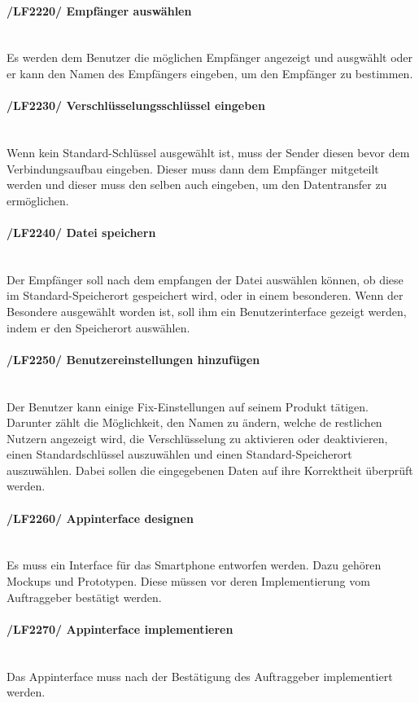 \begin{indentE}
	\paragraph{/LF2220/ Empfänger auswählen}\mbox{}\\
	Es werden dem Benutzer die möglichen Empfänger angezeigt und ausgwählt oder er kann den Namen des Empfängers eingeben, um den Empfänger zu bestimmen.
	\paragraph{/LF2230/ Verschlüsselungsschlüssel eingeben}\mbox{}\\
	Wenn kein Standard-Schlüssel ausgewählt ist, muss der Sender diesen bevor dem Verbindungsaufbau eingeben. Dieser muss dann dem Empfänger mitgeteilt werden und dieser muss den selben auch eingeben, um den Datentransfer zu ermöglichen.
	\paragraph{/LF2240/ Datei speichern}\mbox{}\\
	Der Empfänger soll nach dem empfangen der Datei auswählen können, ob diese im Standard-Speicherort gespeichert wird, oder in einem besonderen. Wenn der Besondere ausgewählt worden ist, soll ihm ein Benutzerinterface gezeigt werden, indem er den Speicherort auswählen.
	\paragraph{/LF2250/ Benutzereinstellungen hinzufügen}\mbox{}\\
	Der Benutzer kann einige Fix-Einstellungen auf seinem Produkt tätigen. Darunter zählt die Möglichkeit, den Namen zu ändern, welche de restlichen Nutzern angezeigt wird, die Verschlüsselung zu aktivieren oder deaktivieren, einen Standardschlüssel auszuwählen und einen Standard-Speicherort auszuwählen. Dabei sollen die eingegebenen Daten auf ihre Korrektheit überprüft werden.
	\paragraph{/LF2260/ Appinterface designen}\mbox{}\\
	Es muss ein Interface für das Smartphone entworfen werden. Dazu gehören Mockups und Prototypen. Diese müssen vor deren Implementierung vom Auftraggeber bestätigt werden.
	\paragraph{/LF2270/ Appinterface implementieren}\mbox{}\\
	Das Appinterface muss nach der Bestätigung des Auftraggeber implementiert werden. 

\end{indentE}
